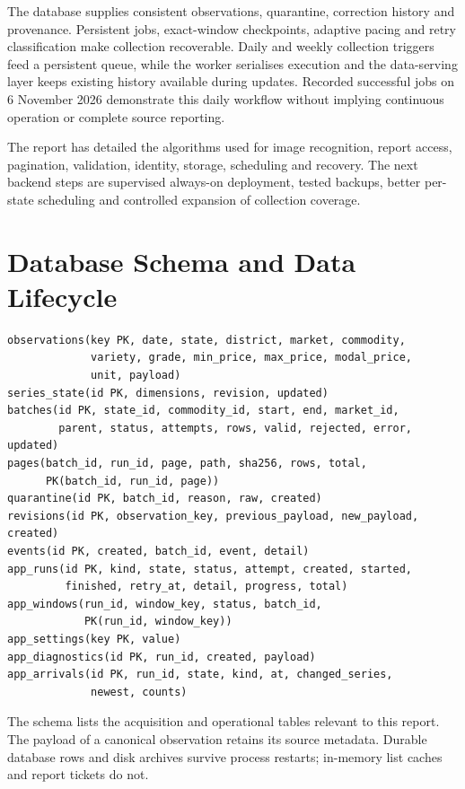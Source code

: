\documentclass[12pt,a4paper,oneside]{report}
\numberwithin{equation}{chapter}
\numberwithin{figure}{chapter}
\numberwithin{table}{chapter}
\theoremstyle{definition}
\begin{document}
The database supplies consistent observations, quarantine, correction history and provenance. Persistent jobs, exact-window checkpoints, adaptive pacing and retry classification make collection recoverable. Daily and weekly collection triggers feed a persistent queue, while the worker serialises execution and the data-serving layer keeps existing history available during updates. Recorded successful jobs on 6 November 2026 demonstrate this daily workflow without implying continuous operation or complete source reporting.

The report has detailed the algorithms used for image recognition, report access, pagination, validation, identity, storage, scheduling and recovery. The next backend steps are supervised always-on deployment, tested backups, better per-state scheduling and controlled expansion of collection coverage.

\appendix
\chapter{Database Schema and Data Lifecycle}
\begin{lstlisting}[caption={Simplified schema; fields omitted where not central}]
observations(key PK, date, state, district, market, commodity,
             variety, grade, min_price, max_price, modal_price,
             unit, payload)
series_state(id PK, dimensions, revision, updated)
batches(id PK, state_id, commodity_id, start, end, market_id,
        parent, status, attempts, rows, valid, rejected, error, updated)
pages(batch_id, run_id, page, path, sha256, rows, total,
      PK(batch_id, run_id, page))
quarantine(id PK, batch_id, reason, raw, created)
revisions(id PK, observation_key, previous_payload, new_payload, created)
events(id PK, created, batch_id, event, detail)
app_runs(id PK, kind, state, status, attempt, created, started,
         finished, retry_at, detail, progress, total)
app_windows(run_id, window_key, status, batch_id,
            PK(run_id, window_key))
app_settings(key PK, value)
app_diagnostics(id PK, run_id, created, payload)
app_arrivals(id PK, run_id, state, kind, at, changed_series,
             newest, counts)
\end{lstlisting}

The schema lists the acquisition and operational tables relevant to this report. The payload of a canonical observation retains its source metadata. Durable database rows and disk archives survive process restarts; in-memory list caches and report tickets do not.
\end{document}
